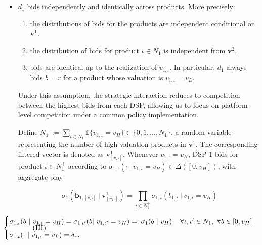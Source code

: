 \documentclass[11pt]{article}
\theoremstyle{plain}
\theoremstyle{definition}
\theoremstyle{plain}
\theoremstyle{plain}
\theoremstyle{plain}
\theoremstyle{plain}
\numberwithin{equation}{section}
\begin{document}
\begin{itemize}
    \item $ d_1 $ bids independently and identically across products. More precisely:

    \begin{enumerate}[(1)]

        \item the distributions of bids for the products are independent conditional on $ \bm{v}^1 $.

        \vspace{0.1cm}

        \item the distribution of bids for product $ \iota \in N_1 $ is independent from $ \bm{v}^{2} $.

        \vspace{0.1cm}

        \item bids are identical up to the realization of $ v_{1,\iota} $. In particular, $ d_1 $ always bids $ b = r $ for a product whose valuation is $ v_{1,\iota} = v_L $.

    \end{enumerate}

    \vspace{0.2cm}

\noindent Under this assumption, the strategic interaction reduces to competition between the highest bids from each DSP, allowing us to focus on platform-level competition under a common policy implementation.

    \vspace{0.2cm}

    \noindent Define $N_1^+ := \sum_{\iota \in N_1}\mathbb{1}\{v_{1,\iota} = v_H\} \in \{0, 1, ..., N_1\}$, a random variable representing the number of high-valuation products in $\bm{v}^1$. The corresponding filtered vector is denoted as $\bm{v}^1_{[v_H]}$. Whenever $v_{1,\iota} = v_H$, DSP $ 1 $ bids for product $ \iota \in N_1^+ $ according to $ \sigma_{1,\iota} ( \cdot \ | \ v_{1,\iota} = v_H) \in \Delta([0,v_H]) $, with aggregate play

    \begin{equation*}\tag{I $\cap$ II}\label{indep}
     \sigma_1 \left(\bm{b}_{1, [v_H]}\ \Big| \ \bm{v}^1_{[v_H]}\right) = \prod_{\iota \in N_1^+} \sigma_{1, \iota} (b_{1,\iota}\ | \ v_{1,\iota} = v_H)
    \end{equation*}

    \begin{equation*}\tag{III}\label{ident} \hspace{-2.2cm}
        \begin{cases}
          \sigma_{1,\iota} (b \ | \ v_{1,\iota} = v_H) = \sigma_{1,\iota'} (b | \ v_{1,\iota'} = v_H) =: \sigma_1 (b \ | \ v_H) \hspace{0.4cm}  \forall \iota, \iota' \in N_1, \ \forall b \in [0,v_H] \\[5pt]
          \sigma_{1,\iota} ( \cdot \ | \ v_{1,\iota} = v_L) = \delta_r.
        \end{cases}
    \end{equation*}


\end{itemize}
\end{document}
